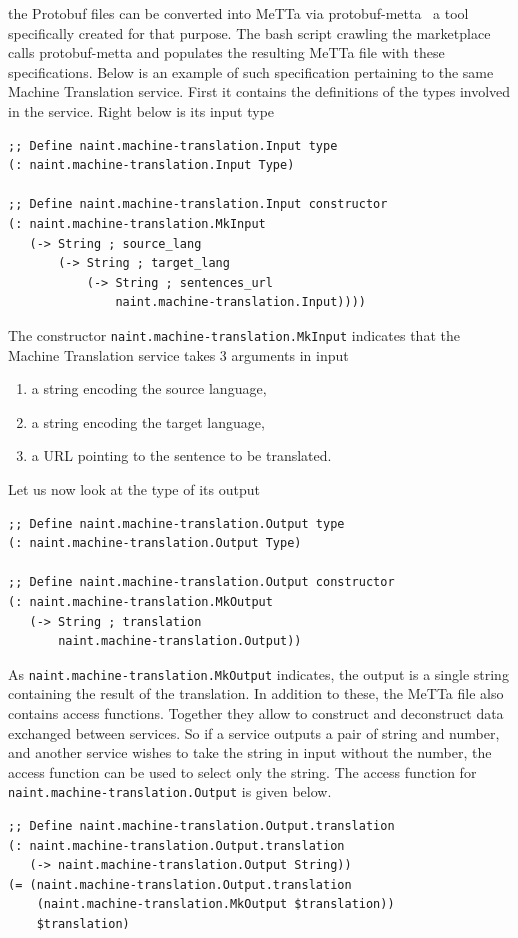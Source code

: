 \documentclass[]{report}
\begin{document}
the Protobuf files can be converted into MeTTa via
protobuf-metta~\cite{ProtoMeTTa} a tool specifically created for that
purpose.  The bash script crawling the marketplace calls
protobuf-metta and populates the resulting MeTTa file with these
specifications.  Below is an example of such specification pertaining
to the same Machine Translation service.  First it contains the
definitions of the types involved in the service.  Right below is its
input type
\begin{verbatim}
;; Define naint.machine-translation.Input type
(: naint.machine-translation.Input Type)

;; Define naint.machine-translation.Input constructor
(: naint.machine-translation.MkInput
   (-> String ; source_lang
       (-> String ; target_lang
           (-> String ; sentences_url
               naint.machine-translation.Input))))
\end{verbatim}
The constructor \texttt{naint.machine-translation.MkInput}
indicates that the Machine Translation service takes 3 arguments in
input
\begin{enumerate}
\item a string encoding the source language,
\item a string encoding the target language,
\item a URL pointing to the sentence to be translated.
\end{enumerate}
Let us now look at the type of its output
\begin{verbatim}
;; Define naint.machine-translation.Output type
(: naint.machine-translation.Output Type)

;; Define naint.machine-translation.Output constructor
(: naint.machine-translation.MkOutput
   (-> String ; translation
       naint.machine-translation.Output))
\end{verbatim}
As \texttt{naint.machine-translation.MkOutput} indicates,
the output is a single string containing the result of the
translation.  In addition to these, the MeTTa file also contains
access functions.  Together they allow to construct and deconstruct
data exchanged between services.  So if a service outputs a pair of
string and number, and another service wishes to take the string in
input without the number, the access function can be used to select
only the string.  The access function for
\texttt{naint.machine-translation.Output} is given below.
\begin{verbatim}
;; Define naint.machine-translation.Output.translation
(: naint.machine-translation.Output.translation
   (-> naint.machine-translation.Output String))
(= (naint.machine-translation.Output.translation
    (naint.machine-translation.MkOutput $translation))
    $translation)
\end{verbatim}
\end{document}
